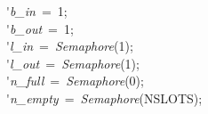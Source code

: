 \'\>\textit{b\_in}~=~1;\\

\'\>\textit{b\_out}~=~1;\\

\'\>\textit{l\_in}~=~\textit{Semaphore}(1);\\

\'\>\textit{l\_out}~=~\textit{Semaphore}(1);\\

\'\>\textit{n\_full}~=~\textit{Semaphore}(0);\\

\'\>\textit{n\_empty}~=~\textit{Semaphore}(NSLOTS);
